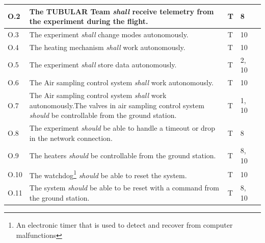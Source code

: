 \documentclass[a4paper,12pt,twoside]{article}
\begin{document}
\begin{longtable}[]{|m{}| m{} |m{} |m{}|m{}|}
O.2  & The TUBULAR Team \textit{shall} receive telemetry from the experiment during the flight.                                                                              &    T          & 8            &        \\ \hline
O.3  & The experiment \textit{shall} change modes autonomously.                                                                                                              &        T      & 10            &        \\ \hline
O.4  & The heating mechanism \textit{shall} work autonomously.                                                                                                               &        T      & 10            &        \\ \hline
O.5  & The experiment \textit{shall} store data autonomously.                                                                                                                &       T       & 2, 10            &        \\ \hline
O.6  & The Air sampling control system \textit{shall} work autonomously.                                                                                                     &        T      & 10            &        \\ \hline
O.7  & The Air sampling control system \textit{shall} work autonomously.The valves in air sampling control system \textit{should} be controllable from the ground station. &      T        & 1, 10            &        \\ \hline
O.8  & The experiment \textit{should} be able to handle a timeout or drop in the network connection.                                                                         &    T          &  8           &        \\ \hline
O.9  & The heaters \textit{should} be controllable from the ground station.                                                                                                  &     T         &  8, 10           &        \\ \hline
O.10 & The watchdog\footnote{An electronic timer that is used to detect and recover from computer malfunctions} \textit{should} be able to reset the system.               &     T         & 10            &        \\ \hline
O.11 & The system \textit{should} be able to be reset with a command from the ground station.                                                                                &     T         & 8, 10            &        \\ \hline

\end{longtable}
\end{document}
